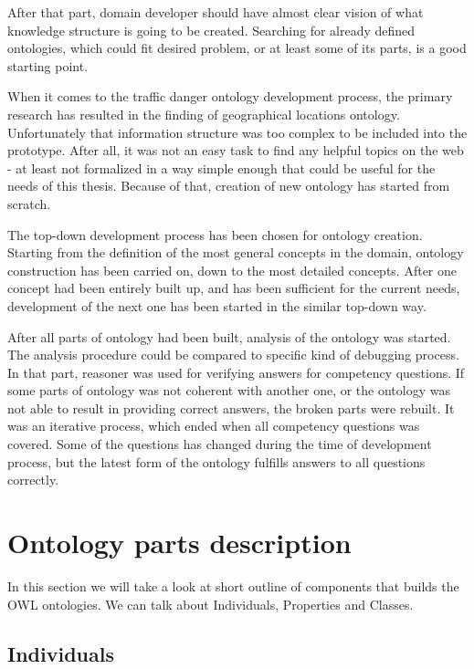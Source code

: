 \noindent After that part, domain developer should have almost clear vision of what knowledge structure is going to be created. Searching for already defined ontologies, which could fit desired problem, or at least some of its parts, is a good starting point. 

When it comes to the traffic danger ontology development process, the primary research has resulted in the finding of geographical locations ontology. Unfortunately that information structure was too complex to be included into the prototype. After all, it was not an easy task to find any helpful topics on the web - at least not formalized in a way simple enough that could be useful for the needs of this thesis. Because of that, creation of new ontology has started from scratch.

The top-down development process has been chosen for ontology creation. Starting from the definition of the most general concepts in the domain, ontology construction has been carried on, down to the most detailed concepts. After one concept had been entirely built up, and has been sufficient for the current needs, development of the next one has been started in the similar top-down way.

After all parts of ontology had been built, analysis of the ontology was started. The analysis procedure could be compared to specific kind of debugging process. In that part, reasoner was used for verifying answers for competency questions. If some parts of ontology was not coherent with another one, or the ontology was not able to result in providing correct answers, the broken parts were rebuilt. It was an iterative process, which ended when all competency questions was covered. Some of the questions has changed during the time of development process, but the latest form of the ontology fulfills answers to all questions correctly.

\section{Ontology parts description}
\label{sec:description}

In this section we will take a look at short outline of components that builds the OWL ontologies. We can talk about Individuals, Properties and Classes.

\subsection{Individuals}
\label{sub:individuals}

